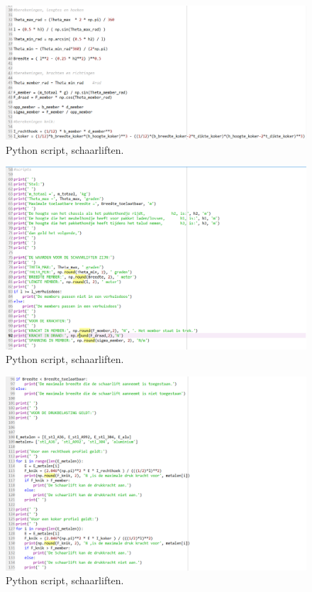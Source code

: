 \begin{figure}[H]
    \centering
    \includegraphics[width = 120mm]{06_bijlage_F/Schaarlift_script/berekeningen_schaarlift.PNG}
    \caption{Python script, schaarliften.}
    \label{fig:schaarliften_berekeningen}
\end{figure}
\vspace{\baselineskip}

\begin{figure}[H]
    \centering
    \includegraphics[width = 120mm]{06_bijlage_F/Schaarlift_script/prints1_schaarlift.PNG}
    \caption{Python script, schaarliften.}
    \label{fig:schaarliften_sript1}
\end{figure}
\vspace{\baselineskip}

\begin{figure}[H]
    \centering
    \includegraphics[width = 120mm]{06_bijlage_F/Schaarlift_script/prints2_schaarlift.PNG}
    \caption{Python script, schaarliften.}
    \label{fig:schaarliften_sript2}
\end{figure}
\vspace{\baselineskip}

